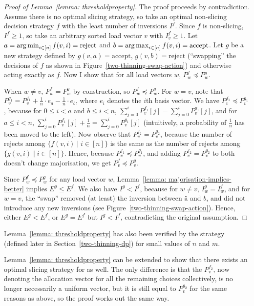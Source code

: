 \begin{proof} [Proof of Lemma~\ref{lemma: thresholdproperty}]
    The proof proceeds by contradiction. Assume there is no optimal slicing strategy, so take an optimal non-slicing decision strategy $f$ with the least number of inversions $I^f$. Since $f$ is non-slicing, $I^f\geq 1$, so take an arbitrary sorted load vector $v$ with $I^f_v\geq 1$. Let $a=\operatorname*{arg\,min}_{i\in [n]} f(v,i)=\mathrm{reject}$ and $b=\operatorname*{arg\,max}_{i\in [n]} f(v,i)=\mathrm{accept}$. Let $g$ be a new strategy defined by $g(v,a)=\mathrm{accept}$, $g(v,b)=\mathrm{reject}$ (``swapping'' the decisions of $f$ as shown in Figure~\ref{two-thinning-swap-action}) and otherwise acting exactly as $f$. Now I show that for all load vectors $w$, $P^f_w\preccurlyeq P^g_w$.
    
    When $w\neq v$, $P^f_w = P^g_w$ by construction, so $P^f_w\preccurlyeq P^g_w$. For $w=v$, note that $P^{g_1}_{v}=P^{f_1}_{v}+\frac{1}{n}\cdot e_a-\frac{1}{n}\cdot e_b$, where $e_i$ denotes the $i$th basis vector. We have $P^{f_1}_{v}\preccurlyeq P^{g_1}_{v}$, because for $0\leq i<a$ and $b\leq i<n$, $\sum_{j=0}^i P^{f_1}_{v}[j] = \sum_{j=0}^i P^{g_1}_{v}[j]$, and for $a\leq i<n$, $\sum_{j=0}^i P^{f_1}_{v}[j] + \frac{1}{n} = \sum_{j=0}^i P^{g_1}_{v}[j]$ (intuitively, a probability of $\frac{1}{n}$ has been moved to the left). Now observe that $P^{f_2}_{v}=P^{g_2}_{v}$, because the number of rejects among $\{f(v,i) \mid i\in [n]\}$ is the same as the number of rejects among $\{g(v,i) \mid i\in [n]\}$. Hence, because $P^{f_1}_{v}\preccurlyeq P^{g_1}_{v}$, and adding $P^{f_2}_{v}=P^{g_2}_{v}$ to both doesn't change majorisation, we get $P^f_v \preccurlyeq P^g_v$.
    
    
    Since $P^f_w\preccurlyeq P^g_w$ for any load vector $w$, Lemma~\ref{lemma: majorisation-implies-better} implies $E^g\leq E^f$. We also have $I^g<I^f$, because for $w\neq v$, $I^g_w=I^f_w$, and for $w=v$, the ``swap'' removed (at least) the inversion between $ä$ and $b$, and did not introduce any new inversions (see Figure~\ref{two-thinning-swap-action}). Hence, either $E^g<E^f$, or $E^g=E^f$ but $I^g<I^f$, contradicting the original assumption.
\end{proof}


\begin{remark}
Lemma~\ref{lemma: thresholdproperty} has also been verified by the \DP strategy (defined later in Section~\ref{two-thinning-dp}) for small values of $n$ and $m$.
\end{remark}


\begin{corollary}\label{corollary: threshold-property-k-thinning}
Lemma~\ref{lemma: thresholdproperty} can be extended to show that there exists an optimal slicing strategy for \KThinning as well. The only difference is that the $P^{f_2}_v$, now denoting the allocation vector for all the remaining choices collectively, is no longer necessarily a uniform vector, but it is still equal to $P^{g_2}_v$ for the same reasons as above, so the proof works out the same way.
\end{corollary}


